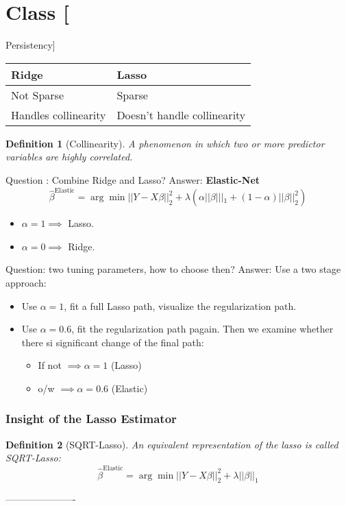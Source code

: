 \documentclass{article}
\newtheorem{definition}{Definition}
\newenvironment{class}[1]
{\section*{Class #1}}
{ ----------------------}
\begin{document}
\begin{class}{3}[Persistency]
  
  \begin{tabular}{| l | l |}
    Ridge & Lasso\\ \hline
    Not Sparse &  Sparse \\ \hline
    Handles collinearity &  Doesn't handle collinearity
  \end{tabular}
  \begin{definition}[Collinearity]
    A phenomenon in which two or more predictor variables are highly correlated.
  \end{definition}
  
  Question : Combine Ridge and Lasso?
  Answer: \textbf{Elastic-Net}
  $$\hat \beta^{\text{Elastic}} = \arg \min ||Y - X\beta||_2^2 + \lambda ( \alpha ||\beta|||_1 + (1-\alpha)||\beta||_2^2)$$
  \begin{itemize}
  \item $\alpha = 1 \implies$ Lasso.
  \item $\alpha = 0 \implies$ Ridge.
  \end{itemize}

  Question: two tuning parameters, how to choose then?
  Answer: Use a two stage approach:
  \begin{itemize}
  \item Use $\alpha = 1$, fit a full Lasso path, visualize the regularization path.
  \item Use $\alpha = 0.6$, fit the regularization path pagain.
    Then we examine whether there si significant change of the final path:
    \begin{itemize}
    \item If not $\implies \alpha = 1$ (Lasso)
    \item o/w $\implies \alpha = 0.6$ (Elastic)
    \end{itemize}
  \end{itemize}

  \subsubsection*{Insight of the Lasso Estimator}
  \begin{definition}[SQRT-Lasso]
    An equivalent representation of the lasso is called SQRT-Lasso:
    \begin{equation}
    \hat \beta^{\text{Elastic}} = \arg \min ||Y - X\beta||_2^2 + \lambda ||\beta||_1\label{eq:*}
  \end{equation}


\end{definition}
\end{class}
\end{document}
